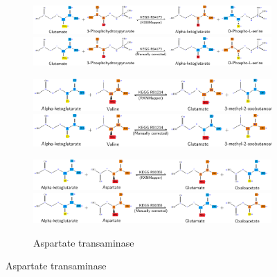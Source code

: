 \documentclass[varwidth=true]{standalone}
\begin{document}
\begin{figure}
\begin{subfigure}[t]{1.0\textwidth}
        \caption{Phosphoserine transaminase (redo)}
        \includegraphics[width=1.0\textwidth]{phosphoserine-transaminase-incorrect.pdf}
        \includegraphics[width=1.0\textwidth]{phosphoserine-transaminase-correct.pdf}
        \caption{Valine transaminase}
        \includegraphics[width=1.0\textwidth]{valine-transaminase-incorrect.pdf}
        \includegraphics[width=1.0\textwidth]{valine-transaminase-correct.pdf}
        \caption{Aspartate transaminase}
        \includegraphics[width=1.0\textwidth]{aspartate-transaminase-incorrect.pdf}
        \includegraphics[width=1.0\textwidth]{aspartate-transaminase-correct.pdf}
    \end{subfigure}
\end{figure}
\end{document}
